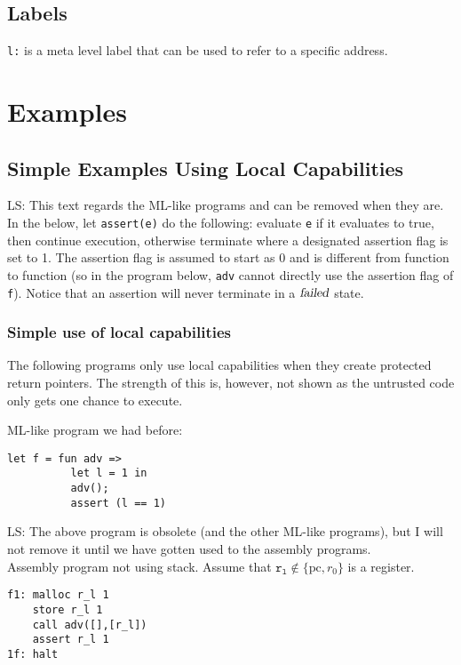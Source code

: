 \documentclass[a4paper]{article}
\newcommand\lau[1]{{\color{purple} \sf \footnotesize {LS: #1}}\\}
\newcommand{\pcreg}{\mathrm{pc}}
\newcommand{\failed}{\textsl{failed}}
\begin{document}
              \subsection{Labels}
              \texttt{l:} is a meta level label that can be used to refer to a specific address.

              \section{Examples}
              \label{sec:examples}
              \subsection{Simple Examples Using Local Capabilities}
              \label{subsec:example-loc-cap}
              \lau{This text regards the ML-like programs and can be removed when they are.}
              In the below, let \texttt{assert(e)} do the following: evaluate \texttt{e} if it evaluates to true, then continue execution, otherwise terminate where a designated assertion flag is set to 1. The assertion flag is assumed to start as 0 and is different from function to function (so in the program below, \texttt{adv} cannot directly use the assertion flag of \texttt{f}). Notice that an assertion will never terminate in a $\failed$ state.
              \subsubsection{Simple use of local capabilities}
              The following programs only use local capabilities when they create protected return pointers. The strength of this is, however, not shown as the untrusted code only gets one chance to execute.

              ML-like program we had before:
\begin{verbatim}
let f = fun adv =>
          let l = 1 in
          adv();
          assert (l == 1)
\end{verbatim}
              \lau{The above program is obsolete (and the other ML-like programs), but I will not remove it until we have gotten used to the assembly programs.}

              Assembly program not using stack. Assume that $\mathtt{r_l} \not\in \{\pcreg,r_0 \}$ is a register.
\begin{verbatim}
f1: malloc r_l 1
    store r_l 1
    call adv([],[r_l])
    assert r_l 1
1f: halt
\end{verbatim}
\end{document}
